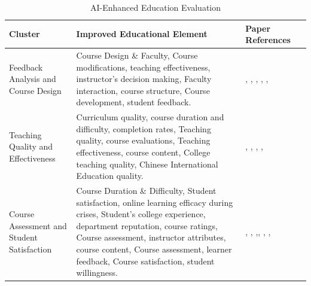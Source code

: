 \documentclass{svproc}
\begin{document}
\begin{table}
    \centering
    \caption{AI-Enhanced Education Evaluation}
    \label{tab:AI_education_evaluation}
    \begin{tabularx}{\textwidth}{|X|X|X|X|}
        \hline
        \textbf{Cluster} & \textbf{Improved Educational Element} & \textbf{Paper References} \\
        \hline
        Feedback Analysis and Course Design & Course Design \& Faculty, Course modifications, teaching effectiveness, instructor's decision making, Faculty interaction, course structure, Course development, student feedback. & \cite{Palaute:_An_Online_Text_Mining_Tool_for_Analyzing_Written_Student_Course_Feedback}, \cite{SUFAT_An_Analytics_Tool_for_Gaining_Insights_from_Student_Feedback_Comments}, \cite{Analyzing_educational_comments_for_topics_and_sentiments:_A_text_analytics_approach}, \cite{Improving_MOOC_quality_using_learning_analytics_and_tools}, \cite{Visualizing_Student_Opinion_Through_Text_Analysis}, \cite{Online_reviews_evaluation_system_for_higher_education_institution:_An_aspect_based_sentiment_analysis_tool} \\
        \hline
        Teaching Quality and Effectiveness & Curriculum quality, course duration and difficulty, completion rates, Teaching quality, course evaluations, Teaching effectiveness, course content, College teaching quality, Chinese International Education quality. & \cite{Competition_Neural_Network_Model_Application_in_the_Bilingual_Teaching_Quality_Evaluation_of_Universities}, \cite{Evaluating_the_quality_of_teaching_in_higher_education_institutes_using_clustering_approach_and_set_pair_analysis}, \cite{Research_on_Project-Based_Teaching_Quality_Evaluation_Based_on_Fuzzy_Cluster_Analysis}, \cite{Research_on_the_Application_of_BP_Neural_Network_in_the_Evaluation_of_College_Teaching_Quality}, \cite{An_Improved_BP_Neural_Network-Based_Quality_Evaluation_Model_for_Chinese_International_Education_Teaching_Courses} \\
        \hline
        Course Assessment and Student Satisfaction & Course Duration \& Difficulty, Student satisfaction, online learning efficacy during crises, Student's college experience, department reputation, course ratings, Course assessment, instructor attributes, course content, Course assessment, learner feedback, Course satisfaction, student willingness. & \cite{Experience_in_learners_review_to_determine_attribute_relation_for_course_completion}, \cite{An_Efficient_Data_Mining_Technique_for_Assessing_Satisfaction_Level_With_Online_Learning_for_Higher_Education_Students_During_the_COVID-19}, \cite{Romanov},\cite{Understanding_Students_Online_Reviews_to_Improve_College_Experience_and_Graduation_Rates_of_STEM_Programs_at_the_Largest_Post-Secondary_Institution_A_Learner-Centered_Study}, \cite{What_predicts_student_satisfaction_with_MOOCs:_A_gradient_boosting_trees_supervised_machine_learning_and_sentiment_analysis_approach}, \cite{Assessing_learners_satisfaction_in_collaborative_online_courses_through_a_big_data_approach}, \cite{Course_Satisfaction_in_Engineering_Education_Through_the_Lens_of_Student_Agency_Analytics} \\

\end{tabularx}
\end{table}
\end{document}
